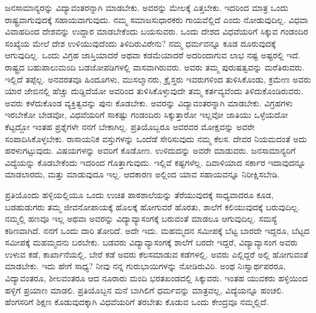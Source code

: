 \vspace{0.2cm}

ಜನಸಾಮಾನ್ಯರನ್ನು ವಿದ್ಯಾವಂತರನ್ನಾಗಿ ಮಾಡಬೇಕು. ಅವರನ್ನು ಮೇಲಕ್ಕೆ ಎತ್ತಬೇಕು. ಇದರಿಂದ ಮಾತ್ರ ಒಂದು ರಾಷ್ಟ್ರವಾಗುವುದಕ್ಕೆ ಸಹಾಯವಾಗುವುದು. ನಮ್ಮ ಸಮಾಜಸುಧಾರಕರು ಗಾಯವೆಲ್ಲಿದೆ ಎಂದು ನೋಡುವುದಿಲ್ಲ. ವಿಧವಾ ವಿವಾಹದಿಂದ ದೇಶವನ್ನು ಉದ್ದಾರ ಮಾಡಬೇಕೆಂದು ಬಯಸುವರು. ಒಂದು ದೇಶದ ವಿಧವೆಯರಿಗೆ ಸಿಕ್ಕುವ ಗಂಡಂದಿರ ಸಂಖ್ಯೆಯ ಮೇಲೆ ದೇಶ ಉಳಿಯುವುದೆಂದು ತಿಳಿದಿರುವಿರೇನು? ನಮ್ಮ ಧರ್ಮವನ್ನೂ ಕೂಡ ದೂರುವುದಕ್ಕೆ ಆಗುವುದಿಲ್ಲ. ಒಂದು ವಿಗ್ರಹ ಜಾಸ್ತಿಯಾದರೆ ಅಥವಾ ಕಡಮೆಯಾದರೆ ಅದರಿಂದಾಗುವ ಲಾಭ ನಷ್ಟ ಅಷ್ಟರಲ್ಲಿ ಇದೆ. ರಾಷ್ಟ್ರದ ಬಹುಪಾಲುಮಂದಿ ಬಡಜೋಪಡಿಗಳಲ್ಲಿ ವಾಸವಾಗಿರುವರು. ಅವರು ತಮ್ಮ ಪುರುಷತ್ವವನ್ನು ಮರೆತಿರುವರು. ಇಲ್ಲಿದೆ ತಪ್ಪೆಲ್ಲ. ಅನವರತವೂ ಹಿಂದೂಗಳು, ಮುಸಲ್ಮಾನರು, ಕ್ರೈಸ್ತರು ಇವರುಗಳಿಂದ ತುಳಿಸಿಕೊಂಡು, ಕ್ರಮೇಣ ಅವರು ಯಾರ ಜೇಬಿನಲ್ಲಿ ಹೆಚ್ಚು ದುಡ್ಡಿದೆಯೋ ಅವರಿಂದ ತುಳಿಸಿಕೊಳ್ಳುವುದೇ ತಮ್ಮ ಕರ್ತವ್ಯವೆಂದು ತಿಳಿದುಕೊಂಡಿರುವರು. ಅವರು ಕಳೆದುಕೊಂಡ ವ್ಯಕ್ತಿತ್ವವನ್ನು ಪುನಃ ಕೊಡಬೇಕು. ಅವರನ್ನು ವಿದ್ಯಾವಂತರನ್ನಾಗಿ ಮಾಡಬೇಕು. ವಿಗ್ರಹಗಳು ಇರಬೇಕೋ ಬೇಡವೋ, ವಿಧವೆಯರಿಗೆ ಸಾಕಷ್ಟು ಗಂಡಂದಿರು ಸಿಕ್ಕುತ್ತಾರೋ ಇಲ್ಲವೋ ಜಾತಿಯು ಒಳ್ಳೆಯದೋ ಕೆಟ್ಟದ್ದೋ ಇಂತಹ ಪ್ರಶ್ನೆಗಳೇ ನನಗೆ ಬೇಕಾಗಿಲ್ಲ. ಪ್ರತಿಯೊಬ್ಬರೂ ಅವರವರ ಮೋಕ್ಷವನ್ನು ಅವರೇ ಸಂಪಾದಿಸಿಕೊಳ್ಳಬೇಕು. ರಾಸಾಯನಿಕ ವಸ್ತುಗಳನ್ನು ಒಂದೆಡೆ ಸೇರಿಸುವುದು ನಮ್ಮ ಕೆಲಸ. ದೇವರ ನಿಯಮದಂತೆ ಅದು ಹರಳುಗಟ್ಟುವುದು. ವಿಷಯಗಳನ್ನು ಅವರಿಗೆ ಕೊಡೋಣ. ಉಳಿದುದನ್ನು ಅವರೇ ಮಾಡುವರು. ಜನಸಾಮಾನ್ಯರಿಗೆ ವಿದ್ಯೆಯನ್ನು ಕೊಡಬೇಕೆಂದು ಇದರಿಂದ ಗೊತ್ತಾಗುವುದು. ಇಲ್ಲಿವೆ ಕಷ್ಟಗಳೆಲ್ಲ. ದಿವಾಳಿಯಾದ ಸರ್ಕಾರ ಇದಾವುದನ್ನೂ ಮಾಡಲಾರದು, ಮತ್ತು ಮಾಡುವುದೂ ಇಲ್ಲ. ಆದಕಾರಣ ಅಲ್ಲಿಂದ ಯಾವ ಸಹಾಯವನ್ನೂ ನಿರೀಕ್ಷಿಸಬೇಡಿ.

\vspace{0.2cm}

ಪ್ರತಿಯೊಂದು ಹಳ್ಳಿಯಲ್ಲಿಯೂ ಒಂದು ಉಚಿತ ಪಾಠಶಾಲೆಯನ್ನು ತೆರೆಯುವುದಕ್ಕೆ ಸಾಧ್ಯವಾದರೂ ಕೂಡ, ಬಡಹುಡುಗರು ತಮ್ಮ ಜೀವನೋಪಾಯಕ್ಕೆ ಹೊಲಕ್ಕೆ ಹೋಗುವರೆ ಹೊರತು, ಶಾಲೆಗೆ ಕಲಿಯುವುದಕ್ಕೆ ಬರುವುದಿಲ್ಲ. ನಮ್ಮಲ್ಲಿ ಹಣವೂ ಇಲ್ಲ ಅಥವಾ ಅವರನ್ನು ವಿದ್ಯಾವ್ಯಾಸಂಗಕ್ಕೆ ಬರುವಂತೆ ಮಾಡಲೂ ಆಗುವುದಿಲ್ಲ. ಸಮಸ್ಯೆ ಕಠಿಣವಾಗಿದೆ. ನನಗೆ ಒಂದು ದಾರಿ ತೋರಿದೆ. ಅದೇ ಇದು. ಮಹಮ್ಮದನ ಸಮೀಪಕ್ಕೆ ಬೆಟ್ಟ ಬಾರದೇ ಇದ್ದರೂ, ಬೆಟ್ಟದ ಸಮೀಪಕ್ಕೆ ಮಹಮ್ಮದನು ಬರಬೇಕು. ಬಡವರು ವಿದ್ಯಾವ್ಯಾಸಂಗಕ್ಕೆ ಶಾಲೆಗೆ ಬರದೇ ಇದ್ದರೆ, ವಿದ್ಯಾವ್ಯಾಸಂಗ ಅವರು ಉಳುವ ಕಡೆ, ಕಾರ್ಖಾನೆಯಲ್ಲಿ, ಬೇರೆ ಕಡೆ ಅವರು ಕೆಲಸಮಾಡುವ ಕಡೆಗಳಲ್ಲಿ, ಅವರು ಎಲ್ಲಿದ್ದರೆ ಅಲ್ಲಿ ಹೋಗುವಂತೆ ಮಾಡಬೇಕು. ಇದು ಹೇಗೆ ಸಾಧ್ಯ? ನೀವು ನನ್ನ ಗುರುಭಾಯಿಗಳನ್ನು ನೋಡಿರುವಿರಿ. ಅಂಥ ನಿಃಸ್ವಾರ್ಥಪರರೂ, ವಿದ್ಯಾವಂತರೂ, ಶೀಲವಂತರೂ ಆದ ನೂರಾರು ಮಂದಿ ಭರತಖಂಡದಲ್ಲಿ ಸಿಕ್ಕುವರು. ಇಂತಹ ಯುವಕರು ಹಳ್ಳಿಯಿಂದ ಹಳ್ಳಿಗೆ ಪ್ರಯಾಣ ಮಾಡಲಿ. ಪ್ರತಿಯೊಬ್ಬನ ಮನೆ ಬಾಗಿಲಿಗೆ ಧರ್ಮವನ್ನು ಮಾತ್ರವಲ್ಲ, ವಿದ್ಯೆಯನ್ನೂ ಹಂಚಲಿ. ಹೆಂಗಸರಿಗೆ ಶಿಕ್ಷಣ ಕೊಡುವುದಕ್ಕಾಗಿ ವಿಧವೆಯರಿಗೆ ತರಬೇತು ಕೊಡುವ ಒಂದು ಕೇಂದ್ರವೂ ನಮ್ಮಲ್ಲಿದೆ.

\vspace{0.2cm}

